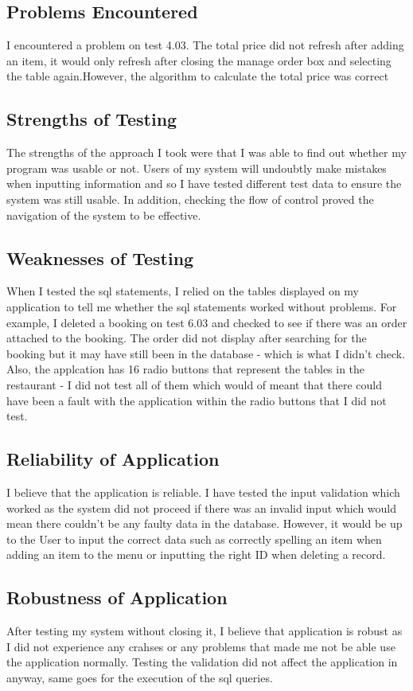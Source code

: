 \subsection{Problems Encountered}

I encountered a problem on test 4.03. The total price did not refresh after adding an item, it would only refresh after closing the manage order box and selecting the table again.However, the algorithm to calculate the total price was correct  

\subsection{Strengths of Testing}

The strengths of the approach I took were that I was able to find out whether my program was usable or not. Users of my system will undoubtly make mistakes when inputting information and so I have tested different test data to ensure the system was still usable. In addition, checking the flow of control proved the navigation of the system to be effective.

\subsection{Weaknesses of Testing}

When I tested the sql statements, I relied on the tables displayed on my application to tell me whether the sql statements worked without problems. For example, I deleted a booking on test 6.03 and checked to see if there was an order attached to the booking. The order did not display after searching for the booking but it may have still been in the database - which is what I didn't check. Also, the applcation has 16 radio buttons that represent the tables in the restaurant - I did not test all of them which would of meant that there could have been a fault with the application within the radio buttons that I did not test.

\subsection{Reliability of Application}

I believe that the application is reliable. I have tested the input validation which worked as the system did not proceed if there was an invalid input which would mean there couldn't be any faulty data in the database. However, it would be up to the User to input the correct data such as correctly spelling an item when adding an item to the menu or inputting the right ID when deleting a record.


\subsection{Robustness of Application}
After testing my system without closing it, I believe that application is robust as I did not experience any crahses or any problems that made me not be able use the application normally. Testing the validation did not affect the application in anyway, same goes for the execution of the sql queries.